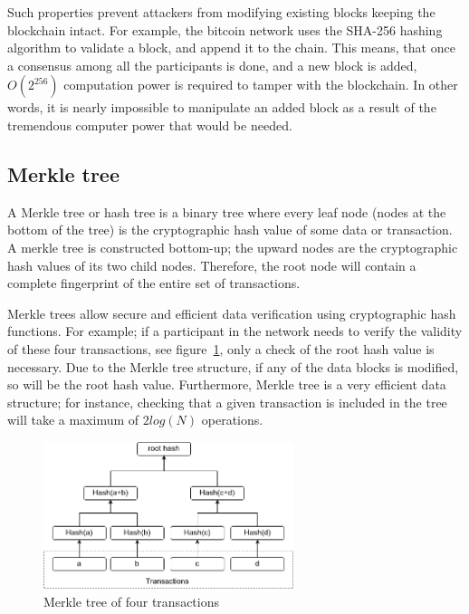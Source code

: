 \documentclass[11pt,a4paper]{report}
\begin{document}
Such properties prevent attackers from modifying existing blocks keeping the blockchain intact. For example, the bitcoin network uses the SHA-256\cite{sha256} hashing algorithm to validate a block, and append it to the chain. This means, that once a consensus among all the participants is done, and a new block is added, $ O(2^{256}) $ computation power is required to tamper with the blockchain. In other words, it is nearly impossible to manipulate an added block as a result of the tremendous computer power that would be needed.

\subsection{Merkle tree}\label{sec:mt}
A Merkle tree\cite{article:merkle}\cite{book:merkle} or hash tree is a binary tree where every leaf node (nodes at the bottom of the tree) is the cryptographic hash value of some data or transaction. A merkle tree is constructed bottom-up; the upward nodes are the cryptographic hash values of its two child nodes. Therefore, the root node  will contain a complete fingerprint of the entire set of transactions. 

Merkle trees allow secure and efficient data verification using cryptographic hash functions. For example; if a participant in the network needs to verify the validity of these four transactions, see figure~\ref{fig:merkle}, only a check of the root hash value is necessary. Due to the Merkle tree structure, if any of the data blocks is modified, so will be the root hash value. Furthermore, Merkle tree is a very efficient data structure; for instance, checking that a given transaction is included in the tree will take a maximum of $2log (N)$ operations.
\begin{figure}[htp]
	\centering
	\includegraphics[width=0.65\textwidth]{./images/merkle}
	\caption{Merkle tree of four transactions}
	\label{fig:merkle}
\end{figure}
\end{document}
